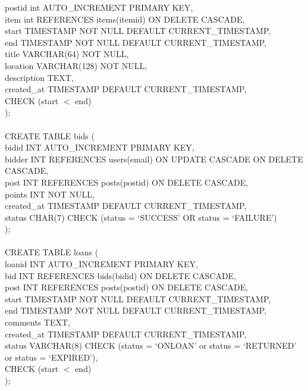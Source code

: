 postid int AUTO\_INCREMENT PRIMARY KEY,\\
item int REFERENCES items(itemid) ON DELETE CASCADE,\\
start TIMESTAMP NOT NULL DEFAULT CURRENT\_TIMESTAMP,\\
end TIMESTAMP NOT NULL DEFAULT CURRENT\_TIMESTAMP, \\
title VARCHAR(64) NOT NULL,\\
location VARCHAR(128) NOT NULL,\\
description TEXT,\\
created\_at TIMESTAMP DEFAULT CURRENT\_TIMESTAMP,\\
CHECK (start $<$ end)\\
);\\\\
CREATE TABLE bids (\\
bidid INT AUTO\_INCREMENT PRIMARY KEY,\\
bidder INT REFERENCES users(email) ON UPDATE CASCADE ON DELETE CASCADE,\\
post INT REFERENCES posts(postid) ON DELETE CASCADE,\\
points INT NOT NULL,\\
created\_at TIMESTAMP DEFAULT CURRENT\_TIMESTAMP,\\
status CHAR(7) CHECK (status = `SUCCESS' OR status = `FAILURE')\\
);\\\\
CREATE TABLE loans (\\
loanid INT AUTO\_INCREMENT PRIMARY KEY,\\
bid INT REFERENCES bids(bidid) ON DELETE CASCADE,\\
post INT REFERENCES posts(postid) ON DELETE CASCADE,\\
start TIMESTAMP NOT NULL DEFAULT CURRENT\_TIMESTAMP,\\
end TIMESTAMP NOT NULL DEFAULT CURRENT\_TIMESTAMP,\\
comments TEXT,\\
created\_at TIMESTAMP DEFAULT CURRENT\_TIMESTAMP,\\
status VARCHAR(8) CHECK (status = `ONLOAN' or status = `RETURNED' or status = `EXPIRED'),\\
CHECK (start $<$ end)\\
);

